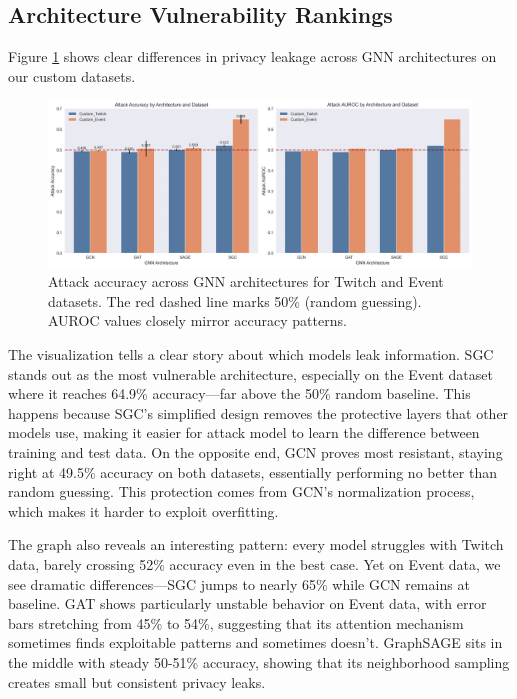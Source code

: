 \documentclass{article}
\begin{document}
\subsection{Architecture Vulnerability Rankings}
Figure \ref{fig:attack-performance} shows clear differences in privacy leakage across GNN architectures on our custom datasets.

\begin{figure}[H]
\centering
\includegraphics[width=\textwidth]{../Results/visualizations/attack_performance_comparison.png}
\caption{Attack accuracy across GNN architectures for Twitch and Event datasets. The red dashed line marks 50\% (random guessing). AUROC values closely mirror accuracy patterns.}
\label{fig:attack-performance}
\end{figure}

The visualization tells a clear story about which models leak information. SGC stands out as the most vulnerable architecture, especially on the Event dataset where it reaches 64.9\% accuracy—far above the 50\% random baseline. This happens because SGC's simplified design removes the protective layers that other models use, making it easier for attack model to learn the difference between training and test data. On the opposite end, GCN proves most resistant, staying right at 49.5\% accuracy on both datasets, essentially performing no better than random guessing. This protection comes from GCN's normalization process, which makes it harder to exploit overfitting.

The graph also reveals an interesting pattern: every model struggles with Twitch data, barely crossing 52\% accuracy even in the best case. Yet on Event data, we see dramatic differences—SGC jumps to nearly 65\% while GCN remains at baseline. GAT shows particularly unstable behavior on Event data, with error bars stretching from 45\% to 54\%, suggesting that its attention mechanism sometimes finds exploitable patterns and sometimes doesn't. GraphSAGE sits in the middle with steady 50-51\% accuracy, showing that its neighborhood sampling creates small but consistent privacy leaks.
\end{document}
